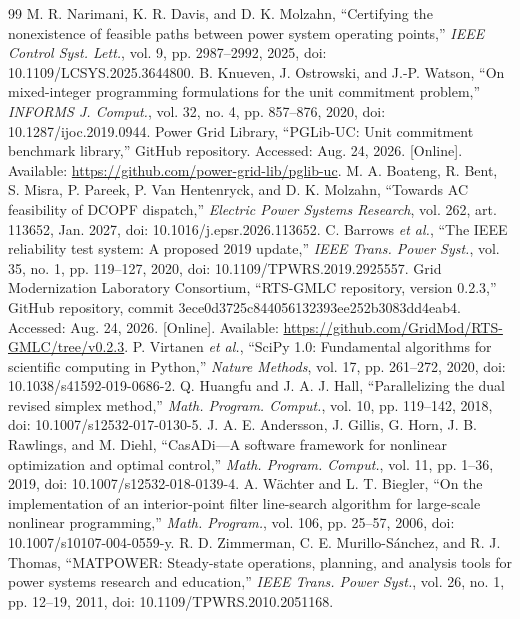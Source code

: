 \begin{thebibliography}{99}
 M. R. Narimani, K. R. Davis, and D. K. Molzahn, ``Certifying the nonexistence of feasible paths between power system operating points,'' \emph{IEEE Control Syst. Lett.}, vol. 9, pp. 2987--2992, 2025, doi: 10.1109/LCSYS.2025.3644800.
 B. Knueven, J. Ostrowski, and J.-P. Watson, ``On mixed-integer programming formulations for the unit commitment problem,'' \emph{INFORMS J. Comput.}, vol. 32, no. 4, pp. 857--876, 2020, doi: 10.1287/ijoc.2019.0944.
 Power Grid Library, ``PGLib-UC: Unit commitment benchmark library,'' GitHub repository. Accessed: Aug. 24, 2026. [Online]. Available: \url{https://github.com/power-grid-lib/pglib-uc}.
 M. A. Boateng, R. Bent, S. Misra, P. Pareek, P. Van Hentenryck, and D. K. Molzahn, ``Towards AC feasibility of DCOPF dispatch,'' \emph{Electric Power Systems Research}, vol. 262, art. 113652, Jan. 2027, doi: 10.1016/j.epsr.2026.113652.
 C. Barrows \emph{et al.}, ``The IEEE reliability test system: A proposed 2019 update,'' \emph{IEEE Trans. Power Syst.}, vol. 35, no. 1, pp. 119--127, 2020, doi: 10.1109/TPWRS.2019.2925557.
 Grid Modernization Laboratory Consortium, ``RTS-GMLC repository, version 0.2.3,'' GitHub repository, commit 3ece0d3725c844056132393ee252b3083dd4eab4. Accessed: Aug. 24, 2026. [Online]. Available: \url{https://github.com/GridMod/RTS-GMLC/tree/v0.2.3}.
 P. Virtanen \emph{et al.}, ``SciPy 1.0: Fundamental algorithms for scientific computing in Python,'' \emph{Nature Methods}, vol. 17, pp. 261--272, 2020, doi: 10.1038/s41592-019-0686-2.
 Q. Huangfu and J. A. J. Hall, ``Parallelizing the dual revised simplex method,'' \emph{Math. Program. Comput.}, vol. 10, pp. 119--142, 2018, doi: 10.1007/s12532-017-0130-5.
 J. A. E. Andersson, J. Gillis, G. Horn, J. B. Rawlings, and M. Diehl, ``CasADi---A software framework for nonlinear optimization and optimal control,'' \emph{Math. Program. Comput.}, vol. 11, pp. 1--36, 2019, doi: 10.1007/s12532-018-0139-4.
 A. W\"achter and L. T. Biegler, ``On the implementation of an interior-point filter line-search algorithm for large-scale nonlinear programming,'' \emph{Math. Program.}, vol. 106, pp. 25--57, 2006, doi: 10.1007/s10107-004-0559-y.
 R. D. Zimmerman, C. E. Murillo-S\'anchez, and R. J. Thomas, ``MATPOWER: Steady-state operations, planning, and analysis tools for power systems research and education,'' \emph{IEEE Trans. Power Syst.}, vol. 26, no. 1, pp. 12--19, 2011, doi: 10.1109/TPWRS.2010.2051168.

\end{thebibliography}
